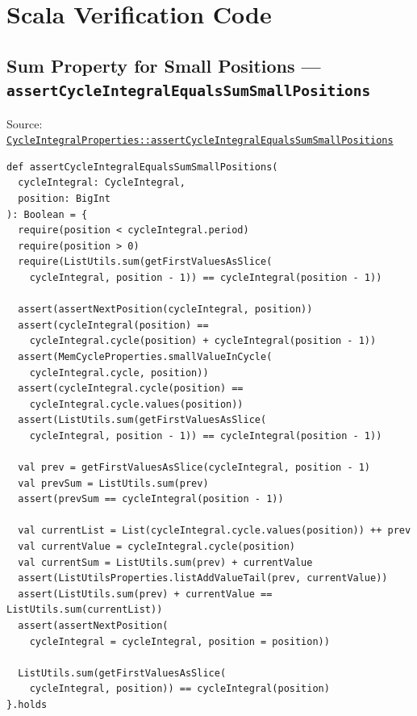 \section{Scala Verification Code}

\subsection{Sum Property for Small Positions --- \texorpdfstring{\texttt{assert\allowbreak Cycle\allowbreak Integral\allowbreak Equals\allowbreak Sum\allowbreak Small\allowbreak Positions}}{assertCycleIntegralEqualsSumSmallPositions}}

{\raggedright Source: \href{https://github.com/thiagomata/prime-numbers/blob/integral-cycle-article-v1.0.0/src/main/scala/v1/chapter4/cycle/integral/recursive/properties/CycleIntegralProperties.scala}{\texttt{Cycle\allowbreak Integral\allowbreak Properties::assert\allowbreak Cycle\allowbreak Integral\allowbreak Equals\allowbreak Sum\allowbreak Small\allowbreak Positions}}\par}

\begin{lstlisting}[style=scala]
def assertCycleIntegralEqualsSumSmallPositions(
  cycleIntegral: CycleIntegral,
  position: BigInt
): Boolean = {
  require(position < cycleIntegral.period)
  require(position > 0)
  require(ListUtils.sum(getFirstValuesAsSlice(
    cycleIntegral, position - 1)) == cycleIntegral(position - 1))

  assert(assertNextPosition(cycleIntegral, position))
  assert(cycleIntegral(position) ==
    cycleIntegral.cycle(position) + cycleIntegral(position - 1))
  assert(MemCycleProperties.smallValueInCycle(
    cycleIntegral.cycle, position))
  assert(cycleIntegral.cycle(position) ==
    cycleIntegral.cycle.values(position))
  assert(ListUtils.sum(getFirstValuesAsSlice(
    cycleIntegral, position - 1)) == cycleIntegral(position - 1))

  val prev = getFirstValuesAsSlice(cycleIntegral, position - 1)
  val prevSum = ListUtils.sum(prev)
  assert(prevSum == cycleIntegral(position - 1))

  val currentList = List(cycleIntegral.cycle.values(position)) ++ prev
  val currentValue = cycleIntegral.cycle(position)
  val currentSum = ListUtils.sum(prev) + currentValue
  assert(ListUtilsProperties.listAddValueTail(prev, currentValue))
  assert(ListUtils.sum(prev) + currentValue == ListUtils.sum(currentList))
  assert(assertNextPosition(
    cycleIntegral = cycleIntegral, position = position))

  ListUtils.sum(getFirstValuesAsSlice(
    cycleIntegral, position)) == cycleIntegral(position)
}.holds
\end{lstlisting}

